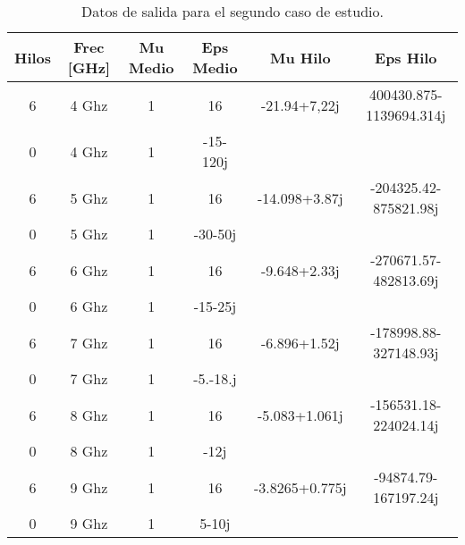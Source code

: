 \documentclass[12pt,letterpaper]{report}
\numberwithin{equation}{section}
\begin{document}
\begin{table}[H]
	\centering
	\caption{Datos de salida para el segundo caso de estudio.}
	\label{tabla3}
	\begin{tabular}{@{}|c|c|c|c|c|c|@{}}
		\toprule
		\textbf{Hilos} & \textbf{Frec {[}GHz{]}} & \textbf{Mu Medio} & \textbf{Eps Medio} & \textbf{Mu Hilo}   & \textbf{Eps Hilo}       \\ \midrule
		6              & 4 Ghz                   & 1                 & 16                 & -21.94+7,22j       & 400430.875-1139694.314j \\ \midrule
		0              & 4 Ghz                   & 1                 & -15-120j           &                    &                         \\ \midrule
		6              & 5 Ghz                   & 1                 & 16                 & -14.098+3.87j      & -204325.42-875821.98j   \\ \midrule
		0              & 5 Ghz                   & 1                 & -30-50j            &                    &                         \\ \midrule
		6              & 6 Ghz                   & 1                 & 16                 & -9.648+2.33j       & -270671.57-482813.69j   \\ \midrule
		0              & 6 Ghz                   & 1                 & -15-25j            &                    &                         \\ \midrule
		6              & 7 Ghz                   & 1                 & 16                 & -6.896+1.52j       & -178998.88-327148.93j   \\ \midrule
		0              & 7 Ghz                   & 1                 & -5.-18.j           &                    &                         \\ \midrule
		6              & 8 Ghz                   & 1                 & 16                 & -5.083+1.061j      & -156531.18-224024.14j   \\ \midrule
		0              & 8 Ghz                   & 1                 & -12j               &                    &                         \\ \midrule
		6              & 9 Ghz                   & 1                 & 16                 & -3.8265+0.775j     & -94874.79-167197.24j    \\ \midrule
		0              & 9 Ghz                   & 1                 & 5-10j              &                    &                         \\ \midrule

\end{tabular}
\end{table}
\end{document}
